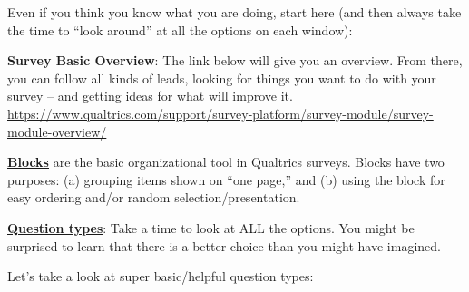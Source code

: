 \documentclass[
  english,
]{book}
\begin{document}
Even if you think you know what you are doing, start here (and then always take the time to ``look around'' at all the options on each window):

\textbf{Survey Basic Overview}: The link below will give you an overview. From there, you can follow all kinds of leads, looking for things you want to do with your survey -- and getting ideas for what will improve it.
\url{https://www.qualtrics.com/support/survey-platform/survey-module/survey-module-overview/}

\href{https://www.qualtrics.com/support/survey-platform/survey-module/block-options/block-options-overview/}{\textbf{Blocks}} are the basic organizational tool in Qualtrics surveys. Blocks have two purposes: (a) grouping items shown on ``one page,'' and (b) using the block for easy ordering and/or random selection/presentation.

\href{https://www.qualtrics.com/support/survey-platform/survey-module/editing-questions/question-types-guide/question-types-overview/}{\textbf{Question types}}: Take a time to look at ALL the options. You might be surprised to learn that there is a better choice than you might have imagined.

Let's take a look at super basic/helpful question types:
\end{document}
